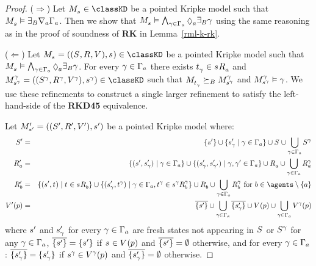 \begin{proof}
($\Rightarrow$) Let $\kPModel{\kStateS} \in \classKD$ be a pointed Kripke model such that $\kPModel{\kStateS} \entails \somerefsBs \coversA \Gamma_\agentA$.
Then we show that $\kPModel{\kStateS} \entails \bigwedge_{\gamma \in \Gamma_\agentA} \possibleA \somerefsBs \gamma$ using the same reasoning as in the proof of soundness of {\bf RK} in Lemma~\ref{rml-k-rk}.

($\Leftarrow$) Let $\kPModelAndTuple{\kStateS} \in \classKD$ be a pointed Kripke model such that $\kPModel{\kStateS} \entails \bigwedge_{\gamma \in \Gamma_\agentA} \possibleA \somerefsBs \gamma$.
For every $\gamma \in \Gamma_\agentA$ there exists $\kStateT_\gamma \in \kSuccessorsA{\kStateS}$ and $\kPModelAndTuple[\gamma]{\kStateS[\gamma]} \in \classKD$ such that $\kPModel{\kStateT_\gamma} \simulatesBs \kPModel[\gamma]{\kStateS[\gamma]}$ and $\kPModel[\gamma]{\kStateS[\gamma]} \entails \gamma$.
We use these refinements to construct a single larger refinement to satisfy the left-hand-side of the {\bf RKD45} equivalence.

Let $\kPModelAndTupleP{\kStateSP}$ be a pointed Kripke model where:
\begin{eqnarray*}
    \kStatesP &=& \{\kStateSP\} \cup \{\kStateSP_\gamma \mid \gamma \in \Gamma_\agentA\} \cup \kStates \cup \bigcup_{\gamma \in \Gamma_\agentA} \kStates[\gamma]\\
    \kAccessibilityPA &=& \{(\kStateSP, \kStateSP_\gamma) \mid \gamma \in \Gamma_\agentA\} \cup \{(\kStateSP_\gamma, \kStateSP_{\gamma'}) \mid \gamma, \gamma' \in \Gamma_\agentA\} \cup \kAccessibilityA \cup \bigcup_{\gamma \in \Gamma_\agentA} \kAccessibilityA[\gamma]\\
    \kAccessibilityPB &=& \{(\kStateSP, \kStateT) \mid \kStateT \in \kSuccessorsB{\kStateS}\} \cup \{(\kStateSP_\gamma, \kStateT[\gamma]) \mid \gamma \in \Gamma_\agentA, \kStateT[\gamma] \in \kSuccessorsB[\gamma]{\kStateS[\gamma]}\} \cup \kAccessibilityB \cup \bigcup_{\gamma \in \Gamma_\agentA} \kAccessibilityB[\gamma] \text{ for } \agentB \in \agents \setminus \{\agentA\}\\
    \kValuationP(\atomP) &=& \overline{\{\kStateSP\}} \cup \bigcup_{\gamma \in \Gamma_\agentA} \overline{\{\kStateSP_\gamma\}} \cup \kValuation(\atomP) \cup \bigcup_{\gamma \in \Gamma_\agentA} \kValuation[\gamma](\atomP)
\end{eqnarray*}
where $\kStateSP$ and $\kStateSP_\gamma$ for every $\gamma \in \Gamma_\agentA$ are fresh states not appearing in $\kStates$ or $\kStates[\gamma]$ for any $\gamma \in \Gamma_\agentA$, $\overline{\{\kStateSP\}} = \{\kStateSP\}$ if $\kStateS \in \kValuation(\atomP)$ and $\overline{\{\kStateSP\}} = \emptyset$ otherwise, and for every $\gamma \in \Gamma_\agentA$: $\overline{\{\kStateSP_\gamma\}} = \{\kStateSP_\gamma\}$ if $\kStateS[\gamma] \in \kValuation[\gamma](\atomP)$ and $\overline{\{\kStateSP_\gamma\}} = \emptyset$ otherwise.


\end{proof}
